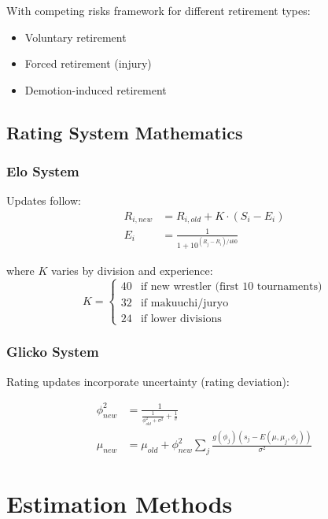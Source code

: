 With competing risks framework for different retirement types:
\begin{itemize}
\item Voluntary retirement
\item Forced retirement (injury)
\item Demotion-induced retirement
\end{itemize}

\subsection{Rating System Mathematics}

\subsubsection{Elo System}

Updates follow:
\begin{align}
R_{i,new} &= R_{i,old} + K \cdot (S_i - E_i) \\
E_i &= \frac{1}{1 + 10^{(R_j - R_i)/400}}
\end{align}

where $K$ varies by division and experience:
\begin{equation}
K = \begin{cases}
40 & \text{if new wrestler (first 10 tournaments)} \\
32 & \text{if makuuchi/juryo} \\
24 & \text{if lower divisions}
\end{cases}
\end{equation}

\subsubsection{Glicko System}

Rating updates incorporate uncertainty (rating deviation):

\begin{align}
\phi_{new}^2 &= \frac{1}{\frac{1}{\phi_{old}^2 + \sigma^2} + \frac{1}{v}} \\
\mu_{new} &= \mu_{old} + \phi_{new}^2 \sum_j \frac{g(\phi_j)(s_j - E(\mu, \mu_j, \phi_j))}{\sigma^2}
\end{align}

\section{Estimation Methods}

